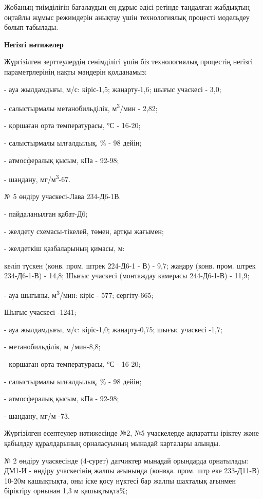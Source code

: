 \begin{multicols}{2}
Жобаның тиімділігін бағалаудың ең дұрыс әдісі ретінде таңдалған
жабдықтың оңтайлы жұмыс режимдерін анықтау үшін технологиялық процесті
модельдеу болып табылады.

{\bfseries Негізгі нәтижелер}

Жүргізілген зерттеулердің сенімділігі үшін біз технологиялық процестің
негізгі параметрлерінің нақты мәндерін қолданамыз:

- ауа жылдамдығы, м/с: кіріс-1,5; жаңарту-1,6; шығыс учаскесі - 3,0;

- салыстырмалы метанобильділік, м\textsuperscript{3}/мин - 2,82;

- қоршаған орта температурасы, °С - 16-20;

- салыстырмалы ылғалдылық, \% - 98 дейін;

- атмосфералық қысым, кПа - 92-98;

- шаңдану, мг/м\textsuperscript{3}-67.

№ 5 өндіру учаскесі-Лава 234-Д6-1В.

- пайдаланылған қабат-Д6;

- желдету схемасы-тікелей, төмен, артқы жағымен;

- желдеткіш қазбаларының қимасы, м:

келіп түскен (конв. пром. штрек 224-Д6-1 - В) - 9,7; жаңару (конв.
пром. штрек 234-Д6-1-В) - 14,8; Шығыс учаскесі (монтаждау камерасы
244-Д6-1-В) - 11,9;

- ауа шығыны, м\textsuperscript{3}/мин: кіріс - 577; сергіту-665;

Шығыс учаскесі -1241;

- ауа жылдамдығы, м/с: кіріс-1,0; жаңарту-0,75; шығыс учаскесі -1,7;

- метанобильділік, м /мин-8,8;

- қоршаған орта температурасы, °С - 16-20;

- салыстырмалы ылғалдылық, \% - 98 дейін;

- атмосфералық қысым, кПа - 92-98;

- шаңдану, мг/м -73.

Жүргізілген есептеулер нәтижесінде №2, №5 учаскелерде ақпаратты іріктеу
және қабылдау құралдарының орналасуының мынадай карталары алынды.

№ 2 өндіру учаскесінде (4-сурет) датчиктер мынадай орындарда орнатылады:
ДМ1-И - өндіру учаскесінің жалпы ағынында (конвқа. пром. штр еке
233-Д11-В) 10-20м қашықтықта, оны іске қосу нүктесі бар жалпы шахталық
ағынмен біріктіру орнынан 1,3 м қашықтықта\%;


\end{multicols}
